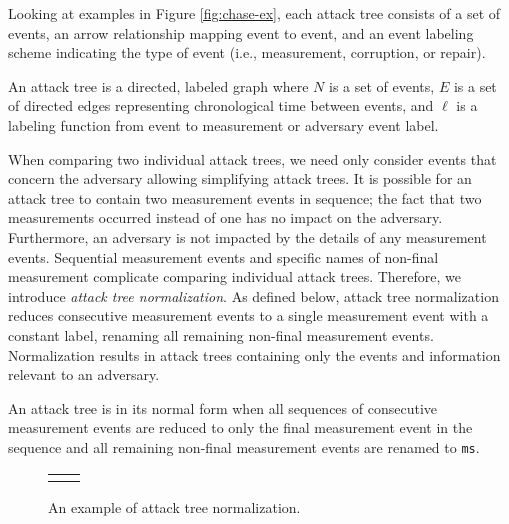\documentclass[runningheads]{llncs}
\theoremstyle{definition}
\begin{document}
\noindent Looking at examples in Figure \ref{fig:chase-ex}, each
attack tree consists of a set of events, an arrow relationship mapping
event to event, and an event labeling scheme indicating the type of
event (i.e., measurement, corruption, or repair).

\begin{definition}
    An attack tree is a directed, labeled graph where $N$ is a set of
    events, $E$ is a set of directed edges representing chronological
    time between events, and $\ell$ is a labeling function from event
    to measurement or adversary event label. 
\end{definition}

When comparing two individual attack trees, we need only consider
events that concern the adversary allowing simplifying attack trees.
It is possible for an attack tree to contain two measurement events in
sequence; the fact that two measurements occurred instead of one has
no impact on the adversary. Furthermore, an adversary is not impacted
by the details of any measurement events. Sequential measurement
events and specific names of non-final measurement complicate
comparing individual attack trees. Therefore, we introduce
\emph{attack tree normalization}. As defined below, attack tree
normalization reduces consecutive measurement events to a single
measurement event with a constant label, renaming all remaining
non-final measurement events.  Normalization results in attack trees
containing only the events and information relevant to an adversary.

\begin{definition}
    An attack tree is in its normal form when all sequences of
    consecutive measurement events are reduced to only the final
    measurement event in the sequence and all remaining non-final
    measurement events are renamed to \texttt{ms}.  
\end{definition}

\begin{figure}[htbp]
  \centering 
  \begin{tabular}{c c}
       &  
  \end{tabular}
  \captionsetup{justification=centering,margin=1cm}
  \caption[Example of attack tree normalization]{An example of attack tree normalization.}
  \label{fig:reduce-ex}
\end{figure}
\end{document}

